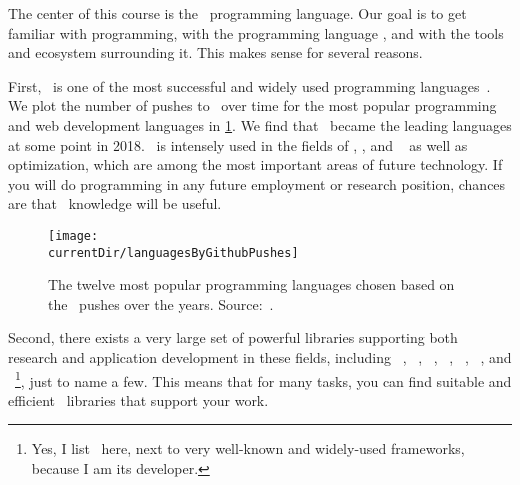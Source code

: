 %
%
The center of this course is the \python\ programming language.
Our goal is to get familiar with programming, with the programming language \python, and with the tools and ecosystem surrounding it.
This makes sense for several reasons.

First, \python\ is one of the most successful and widely used programming languages~\cite{CBST2024LOHPPTDDSAMLA}.
We plot the number of pushes to \github\ over time for the most popular programming and web development languages in \cref{fig:languagesByGithubPushes}.
We find that \python\ became the leading languages at some point in 2018.
\python\ is intensely used in the fields of , , and ~\cite{CBST2024LOHPPTDDSAMLA} as well as optimization, which are among the most important areas of future technology.
If you will do programming in any future employment or research position, chances are that \python\ knowledge will be useful.

\begin{figure}%
\centering%
\texttt{[image: \\currentDir/languagesByGithubPushes]}%
\caption{The twelve most popular programming languages chosen based on the \github\ pushes over the years. Source:~\cite{B2023G2GLS}.}%
\label{fig:languagesByGithubPushes}%
\end{figure}%

Second, there exists a very large set of powerful libraries supporting both research and application development in these fields, including \numpy~\cite{HMvdWGVCWTBSKPHvKBHFdRWPGMSRWAGO2020APWN}, \pandas~\cite{B2012DPWP}, \scikitlearn~\cite{PVGMTGBPWDVPCBPD2011SMLIP}, \scipy~\cite{VGOHRCBPWBvdWBWMMNJKLCPFMVLPCHQHARPvMS2020SFAFSCIP}, \tensorflow~\cite{ABCCDDDGIIKLMMMSTVWWYZ2016TASFLSML}, \matplotlib~\cite{H2007MA2GE}, and \moptipy~\cite{WW2023RSDEWASSAA}\footnote{Yes, I list \moptipy\ here, next to very well-known and widely-used frameworks, because I am its developer.}, just to name a few.
This means that for many tasks, you can find suitable and efficient \python\ libraries that support your work.

